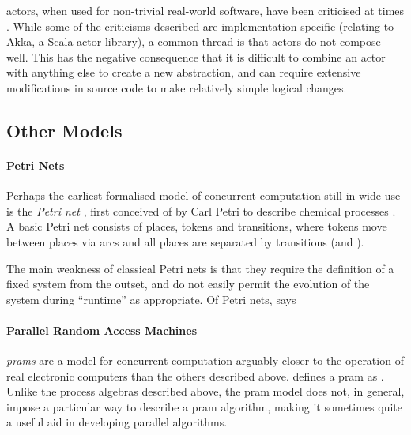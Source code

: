 \Glspl{actor}, when used for non-trivial real-world software, have been criticised at times \eg{} \cite{Welsh2013,Stucchio2013}.  While some of the criticisms described are implementation-specific (relating to Akka, a Scala \gls{actor} library), a common thread is that \glspl{actor} do not compose well.  This has the negative consequence that it is difficult to combine an \gls{actor} with anything else to create a new abstraction, and can require extensive modifications in source code to make relatively simple logical changes.

\subsection{\label{sec:back:othermodels}Other Models}

\paragraph{Petri Nets}
Perhaps the earliest formalised model of concurrent computation still in wide use is the \emph{Petri net} \cite{Dennis2011}, first conceived of by Carl Petri to describe chemical processes \cite{Petri2008}.  A basic Petri net consists of places, tokens and transitions, where tokens move between places via arcs and all places are separated by transitions (and \viceversa).

The main weakness of classical Petri nets is that they require the definition of a fixed system from the outset, and do not easily permit the evolution of the system during ``runtime'' as appropriate.  Of Petri nets, \citeauthor{Varela2013} says 

\paragraph{\label{sec:back:pram}Parallel Random Access Machines}

\emph{\Glspl{pram}} are a model for concurrent computation arguably closer to the operation of real electronic computers than the others described above.  \citeauthor{JaJa2011} defines a \gls{pram} as .  Unlike the process algebras described above, the \gls{pram} model does not, in general, impose a particular way to describe a \gls{pram} algorithm, making it sometimes quite a useful aid in developing parallel algorithms.

